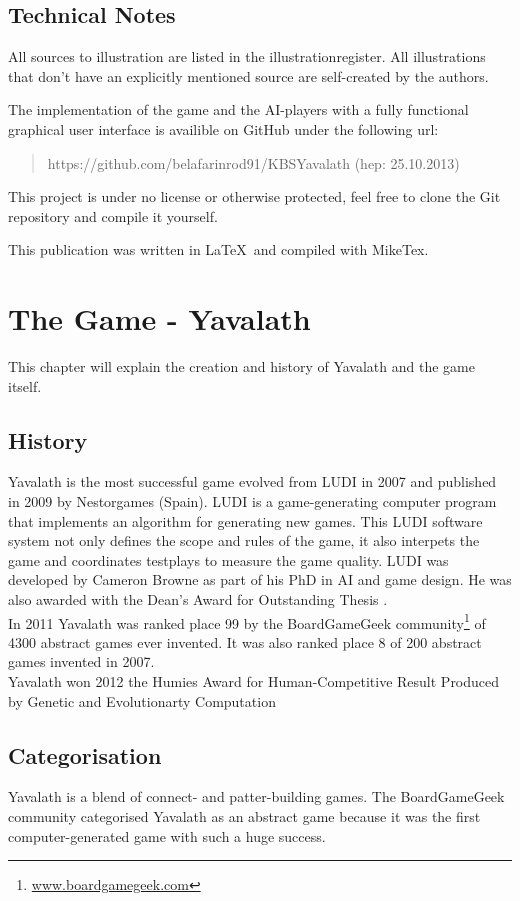 \documentclass[english]{report}
\begin{document}
\section{Technical Notes}
All sources to illustration are listed in the illustrationregister. All illustrations that don't have an explicitly mentioned source are self-created by the authors.


The implementation of the game and the AI-players with a fully functional
graphical user interface is availible on GitHub under the following url:
\begin{quotation}
    https://github.com/belafarinrod91/KBSYavalath (hep: 25.10.2013)
\end{quotation}
This project is under no license or otherwise protected, feel free to clone the
Git repository and compile it yourself.


This publication was written in \LaTeX \ and compiled with MikeTex.

\chapter{The Game - Yavalath}
\label{sec:chapter2}
This chapter will explain the creation and history of Yavalath and the game itself.

\section{History}
Yavalath is the most successful game evolved from LUDI in 2007 and published in 2009 by Nestorgames (Spain). LUDI is a game-generating computer program 
that implements an algorithm for generating new games. This LUDI software system not only defines the scope and rules of the game, it also interpets 
the game and coordinates testplays to measure the game quality.
LUDI was developed by Cameron Browne as part of his PhD in AI and game design.
He was also awarded with the Dean's Award for Outstanding Thesis
\cite{EvolutionGameDesign}. \\

In 2011 Yavalath was ranked place 99 by the BoardGameGeek
community\footnote{\url{www.boardgamegeek.com}} of 4300 abstract games ever invented.
It was also ranked place 8 of 200 abstract games invented in 2007. \\

Yavalath won 2012 the Humies Award for Human-Competitive Result Produced by Genetic and Evolutionarty Computation

\section{Categorisation}
Yavalath is a blend of connect- and patter-building games. The BoardGameGeek
community categorised Yavalath as an abstract game because it was the first
computer-generated game with such a huge success.
\end{document}
